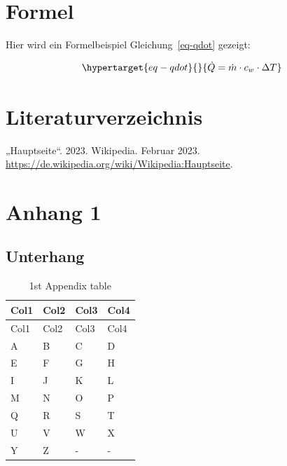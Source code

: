 \documentclass[
  11pt,
]{scrbook}
\newlength{\cslhangindent}
\newlength{\cslentryspacingunit} %
\newenvironment{CSLReferences}[2] %
 {%
  \setlength{\parindent}{0pt}
  \ifodd #1
  \let\oldpar\par
  \def\par{\hangindent=\cslhangindent\oldpar}
  \fi
  \setlength{\parskip}{#2\cslentryspacingunit}
 }%
 {}
\begin{document}
\hypertarget{formel}{%
\chapter{Formel}\label{formel}}

Hier wird ein Formelbeispiel Gleichung~\ref{eq-qdot} gezeigt:

\begin{equation}\protect\hypertarget{eq-qdot}{}{
\dot{Q} = \dot{m} \cdot c_w \cdot \Delta{T}
}\label{eq-qdot}\end{equation}

\hypertarget{literaturverzeichnis}{%
\chapter*{Literaturverzeichnis}\label{literaturverzeichnis}}

\hypertarget{refs}{}
\begin{CSLReferences}{1}{0}
\leavevmode{}%
{„Hauptseite``}. 2023. Wikipedia. Februar 2023.
\url{https://de.wikipedia.org/wiki/Wikipedia:Hauptseite}.

\end{CSLReferences}

\appendix
\renewcommand{\thechapter}{\Alph{chapter}}
\setcounter{chapter}{0}

\hypertarget{anhang-1}{%
\chapter{Anhang 1}\label{anhang-1}}

\setcounter{page}{1}
\renewcommand{\thepage}{\thechapter.\arabic{page}} %

\hypertarget{unterhang}{%
\section{Unterhang}\label{unterhang}}

\hypertarget{tbl-letters-full}{}
\begin{longtable}[]{@{}llll@{}}
\caption{\label{tbl-letters-full}1st Appendix table}\tabularnewline
\toprule\noalign{}
Col1 & Col2 & Col3 & Col4 \\
\midrule\noalign{}
\endfirsthead
\toprule\noalign{}
Col1 & Col2 & Col3 & Col4 \\
\midrule\noalign{}
\endhead
\bottomrule\noalign{}
\endlastfoot
A & B & C & D \\
E & F & G & H \\
I & J & K & L \\
M & N & O & P \\
Q & R & S & T \\
U & V & W & X \\
Y & Z & - & - \\
\end{longtable}
\end{document}
